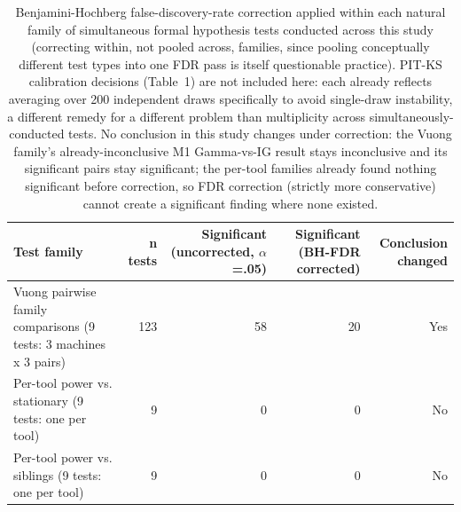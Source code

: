 \begin{table}[t]
\centering
\caption{Benjamini-Hochberg false-discovery-rate correction applied within each natural family of simultaneous formal hypothesis tests conducted across this study (correcting within, not pooled across, families, since pooling conceptually different test types into one FDR pass is itself questionable practice). PIT-KS calibration decisions (Table~1) are not included here: each already reflects averaging over 200 independent draws specifically to avoid single-draw instability, a different remedy for a different problem than multiplicity across simultaneously-conducted tests. No conclusion in this study changes under correction: the Vuong family's already-inconclusive M1 Gamma-vs-IG result stays inconclusive and its significant pairs stay significant; the per-tool families already found nothing significant before correction, so FDR correction (strictly more conservative) cannot create a significant finding where none existed.}
\label{tab:multiple-comparisons}
\begin{tabular}{lrrrr}
\toprule
Test family & n tests & Significant (uncorrected, $\alpha$=.05) & Significant (BH-FDR corrected) & Conclusion changed \\
\midrule
Vuong pairwise family comparisons (9 tests: 3 machines x 3 pairs) & 123 & 58 & 20 & Yes \\
Per-tool power vs. stationary (9 tests: one per tool) & 9 & 0 & 0 & No \\
Per-tool power vs. siblings (9 tests: one per tool) & 9 & 0 & 0 & No \\
\bottomrule
\end{tabular}
\end{table}
